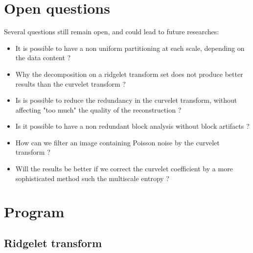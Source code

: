\documentclass[11pt,a4paper]{article}
\begin{document}
\section{Open questions}
Several questions still remain open, and could lead to future researches:
\begin{itemize}
\item It is possible to have a non uniform partitioning at each scale,
depending on the data content ?
\item Why the decomposition on a ridgelet transform set does not produce better
results than the curvelet transform ?
\item Is is possible to reduce the redundancy in the curvelet transform,
without affecting "too much" the quality of the reconstruction ? 
\item Is it possible to have a non redundant block analysis  without
block artifacts ?
\item How can we filter an image containing Poisson noise by the curvelet
transform ?
\item Will the results be better if we correct the curvelet coefficient by a more   sophisticated 
 method such the multiscale 
entropy \cite{starck:sta98_2,starck:sta99_2}  ?
\end{itemize}

\clearpage
\newpage

\section{Program}
\subsection{Ridgelet transform}
\end{document}
